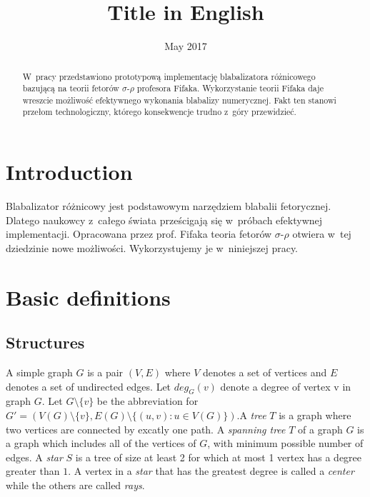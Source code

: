 \documentclass[en]{pracamgr}
\title{Title in English}
\date{May 2017}
\begin{document}
\maketitle

\begin{abstract}
  W~pracy przedstawiono prototypową implementację blabalizatora
  różnicowego bazującą na teorii fetorów $\sigma$-$\rho$ profesora
  Fifaka.  Wykorzystanie teorii Fifaka daje wreszcie możliwość
  efektywnego wykonania blabalizy numerycznej.  Fakt ten stanowi
  przełom technologiczny, którego konsekwencje trudno z~góry
  przewidzieć.
\end{abstract}

\tableofcontents

\chapter*{Introduction}

Blabalizator różnicowy jest podstawowym narzędziem blabalii
fetorycznej.  Dlatego naukowcy z~całego świata prześcigają się
w~próbach efektywnej implementacji.  Opracowana przez prof. Fifaka
teoria fetorów $\sigma$-$\rho$ otwiera w~tej dziedzinie nowe
możliwości.  Wykorzystujemy je w~niniejszej pracy.

\chapter{Basic definitions}\label{r:pojecia}

\section{Structures}

A simple graph $G$ is a pair $(V,E)$ where $V$ denotes a set of vertices
and $E$ denotes a set of undirected edges. Let $deg_G(v)$ denote a degree
of vertex v in graph $G$. Let $G \setminus \{v\}$ be the abbreviation for
$G'=(V(G) \setminus \{v\}, E(G) \setminus \{(u,v): u \in V(G)\})$.A \emph{tree} $T$ is a graph where two
vertices are connected by excatly one path. A \emph{spanning tree} $T$ of a
graph $G$ is a graph which includes all of the vertices of $G$, with minimum
possible number of edges. A \emph{star} $S$ is a tree of size at least 2
for which at most 1 vertex has a degree greater than $1$. A vertex in a \emph{star} that has the greatest degree is called a \emph{center} while the others are called \emph{rays}.
\end{document}
